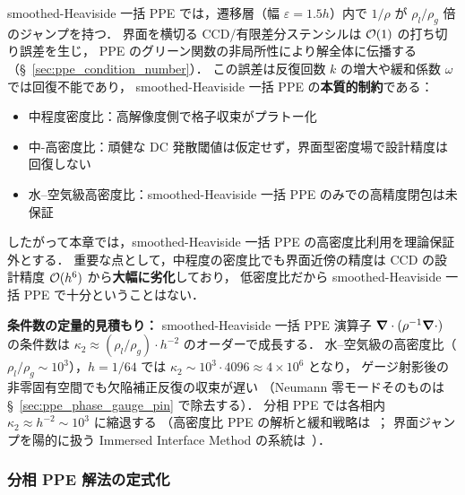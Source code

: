 smoothed-Heaviside 一括 PPE では，遷移層（幅 $\varepsilon = 1.5h$）内で
$1/\rho$ が $\rho_l/\rho_g$ 倍のジャンプを持つ．
界面を横切る CCD/有限差分ステンシルは $\mathcal{O}(1)$ の打ち切り誤差を生じ，
PPE のグリーン関数の非局所性により解全体に伝播する
（§~\ref{sec:ppe_condition_number}）．
この誤差は反復回数 $k$ の増大や緩和係数 $\omega$ では回復不能であり，
smoothed-Heaviside 一括 PPE の\textbf{本質的制約}である：
%
\begin{itemize}[noitemsep]
  \item 中程度密度比：高解像度側で格子収束がプラトー化
  \item 中-高密度比：頑健な DC 発散閾値は仮定せず，界面型密度場で設計精度は回復しない
  \item 水--空気級高密度比：smoothed-Heaviside 一括 PPE のみでの高精度閉包は未保証
\end{itemize}
%
したがって本章では，smoothed-Heaviside 一括 PPE の高密度比利用を理論保証外とする．
重要な点として，中程度の密度比でも界面近傍の精度は
CCD の設計精度 $\mathcal{O}(h^6)$ から\textbf{大幅に劣化}しており，
低密度比だから smoothed-Heaviside 一括 PPE で十分ということはない．

\noindent\textbf{条件数の定量的見積もり：}
smoothed-Heaviside 一括 PPE 演算子 $\bm{\nabla}\cdot(\rho^{-1}\bm{\nabla}\cdot)$ の条件数は
$\kappa_2 \approx (\rho_l/\rho_g)\cdot h^{-2}$ のオーダーで成長する．
水--空気級の高密度比（$\rho_l/\rho_g \sim 10^3$），$h = 1/64$ では
$\kappa_2 \sim 10^3\cdot 4096 \approx 4\times 10^{6}$ となり，
ゲージ射影後の非零固有空間でも欠陥補正反復の収束が遅い
（Neumann 零モードそのものは §~\ref{sec:ppe_phase_gauge_pin} で除去する）．
分相 PPE では各相内 $\kappa_2 \approx h^{-2}\sim 10^{3}$ に縮退する
（高密度比 PPE の解析と緩和戦略は~\cite{Guermond2006,GuermondQuartapelle1998}；
界面ジャンプを陽的に扱う Immersed Interface Method の系統は~\cite{LeVequeLi1994,Li2003IIMOverview}）．

\subsubsection{分相 PPE 解法の定式化}
\label{sec:split_ppe_formulation}


